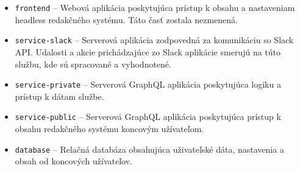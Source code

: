 \begin{itemize}
	\item \texttt{frontend} -- Webová aplikácia poskytujúca prístup k obsahu a nastaveniam headless redakčného systému. Táto časť zostala nezmenená.
	\item \texttt{service-slack} -- Serverová aplikácia zodpovedná za komunikáciu so Slack API. Udalosti a akcie prichádzajúce zo Slack aplikácie smerujú na túto službu, kde sú spracované a vyhodnotené.
	\item \texttt{service-private} -- Serverová GraphQL aplikácia poskytujúca logiku a prístup k dátam  službe.
	\item \texttt{service-public} -- Serverová GraphQL aplikácia poskytujúca prístup k obsahu redakčného systému koncovým užívateľom.
	\item \texttt{database} -- Relačná databáza obsahujúca uživateľské dáta, nastavenia a obsah od koncových užívateľov.
\end{itemize}